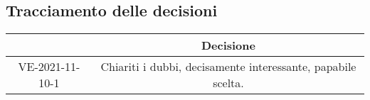 \pagebreak

\subsection{Tracciamento delle decisioni}

\begin{table}[H]
	\centering
	\renewcommand{\arraystretch}{1.8}
	\begin{tabular}{c | c}
		\rowcolor[HTML]{125e28}
		\multicolumn{1}{c}{\color[HTML]{FFFFFF} \textbf{ID}} &
		\multicolumn{1}{c}{\color[HTML]{FFFFFF} \textbf{Decisione}} \\
		\hline
		VE-2021-11-10-1 & Chiariti i dubbi, decisamente interessante, papabile scelta. \\ \hline

	\end{tabular}
\end{table}